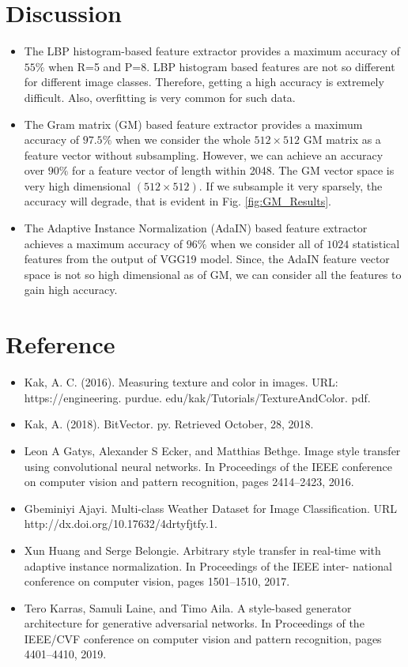 \documentclass{article}
\begin{document}
\section{Discussion}
\begin{itemize}
\item The LBP histogram-based feature extractor provides a maximum accuracy of $55\%$ when R=5 and P=8. LBP histogram based features are not so different for different image classes. Therefore, getting a high accuracy is extremely difficult. Also, overfitting is very common for such data.
\item The Gram matrix (GM) based feature extractor provides a maximum accuracy of $97.5\%$ when we consider the whole $512\times 512$ GM matrix as a feature vector without subsampling. However, we can achieve an accuracy over $90\%$ for a feature vector of length within 2048. The GM vector space is very high dimensional $(512\times 512)$. If we subsample it very sparsely, the accuracy will degrade, that is evident in Fig. \ref{fig:GM_Results}.
\item The Adaptive Instance Normalization (AdaIN) based feature extractor achieves a maximum accuracy of $96\%$ when we consider all of $1024$ statistical features from the output of VGG19 model. Since, the AdaIN feature vector space is not so high dimensional as of GM, we can consider all the features to gain high accuracy.
\end{itemize}

\section{Reference}
\begin{itemize}
\item Kak, A. C. (2016). Measuring texture and color in images. URL: https://engineering. purdue. edu/kak/Tutorials/TextureAndColor. pdf.
\item Kak, A. (2018). BitVector. py. Retrieved October, 28, 2018.
\item Leon A Gatys, Alexander S Ecker, and Matthias Bethge. Image style
transfer using convolutional neural networks. In Proceedings of the IEEE
conference on computer vision and pattern recognition, pages 2414–2423,
2016.
\item Gbeminiyi Ajayi. Multi-class Weather Dataset for Image Classification.
URL http://dx.doi.org/10.17632/4drtyfjtfy.1.
\item Xun Huang and Serge Belongie. Arbitrary style transfer in real-time
with adaptive instance normalization. In Proceedings of the IEEE inter-
national conference on computer vision, pages 1501–1510, 2017.
\item Tero Karras, Samuli Laine, and Timo Aila. A style-based generator
architecture for generative adversarial networks. In Proceedings of the
IEEE/CVF conference on computer vision and pattern recognition, pages
4401–4410, 2019.
\end{itemize}
\newpage
\end{document}
